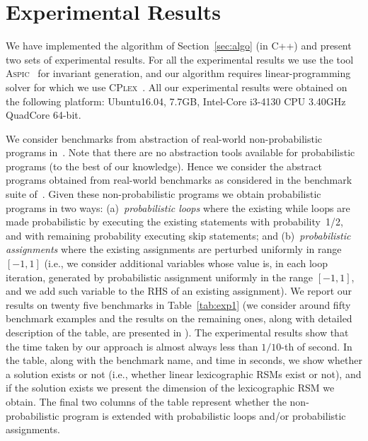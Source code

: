 
\section{Experimental Results}\label{sec:experiments}
We have implemented the algorithm of Section~\ref{sec:algo} (in C++) and present two sets of experimental results.
For all the experimental results we use the tool \textsc{Aspic}~\cite{FG10:aspic} for 
invariant generation, 
and our algorithm requires linear-programming solver for which we use 
\textsc{CPlex}~\cite{cplex}.
All our experimental results were obtained on the following platform: 
Ubuntu16.04, 7.7GB, Intel-Core i3-4130 CPU 3.40GHz QuadCore 64-bit.


\smallskip{}
We consider benchmarks from abstraction of real-world non-probabilistic programs 
in~\cite{ADFG10:lexicographic}.
Note that there are no abstraction tools available for probabilistic programs 
(to the best of our knowledge). 
Hence we consider the abstract programs obtained from real-world benchmarks as 
considered in the benchmark suite of~\cite{ADFG10:lexicographic}.
Given these non-probabilistic programs we obtain probabilistic programs in two ways:
(a)~{\em probabilistic loops} where the existing while loops are made probabilistic 
by executing the existing statements with probability~1/2, and with remaining 
probability executing skip statements; and
(b)~{\em probabilistic assignments} where the existing assignments are perturbed uniformly in range $[-1,1]$ 
(i.e., we consider additional variables whose value is, in each loop iteration, generated by 
probabilistic assignment uniformly in the range $[-1,1]$, and we add such variable 
to the RHS of an existing assignment).
We report our results on twenty five benchmarks in Table~\ref{tab:exp1} (we 
consider around fifty benchmark examples and the results on the remaining ones,
along with detailed description of the table, are presented in \AppendixMaterial).
The experimental results show that the time taken by our approach is almost always less 
than $1/10$-th of second.
In the table, along with the benchmark name, and time in seconds, we show 
whether a solution exists or not (i.e., whether linear lexicographic RSMs exist
or not), and if the solution exists we present the dimension of the lexicographic RSM
we obtain. 
The final two columns of the table represent whether the non-probabilistic 
program is extended with probabilistic loops and/or probabilistic assignments.


